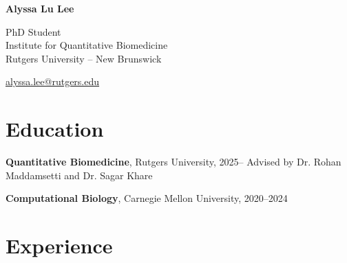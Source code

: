 \documentclass[11pt,letterpaper]{report} %
\newcommand{\myname}{Alyssa Lu Lee}
\newcommand{\namefont}[1]{{\normalfont\bfseries\Huge{#1}}}
\begin{document}
    \raggedright{}

    \namefont{\myname}

    \vspace{1em}
    \begin{minipage}[t]{0.700\textwidth}
        PhD Student \\
        Institute for Quantitative Biomedicine \\
        Rutgers University -- New Brunswick
    \end{minipage}
    \begin{minipage}[t]{0.295\textwidth}
        \raggedleft{}
        \href{mailto:alyssa.lee@rutgers.edu}{alyssa.lee@rutgers.edu}
    \end{minipage}


    \section*{Education}

    \begin{tablist}

        \item[PhD] \tab{}\textbf{Quantitative Biomedicine}, Rutgers University, 2025--
        \tab{}Advised by Dr. Rohan Maddamsetti and Dr. Sagar Khare \\
        \item[BS]  \tab{}\textbf{Computational Biology}, Carnegie Mellon University, 2020--2024

    \end{tablist}



    \section*{Experience}
\end{document}
